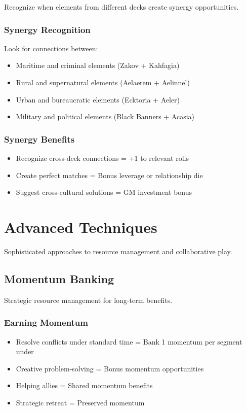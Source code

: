 Recognize when elements from different decks create synergy opportunities.

\subsubsection{Synergy Recognition}

Look for connections between:
\begin{itemize}
\item Maritime and criminal elements (Zakov + Kahfagia)
\item Rural and supernatural elements (Aelaerem + Aelinnel)
\item Urban and bureaucratic elements (Ecktoria + Aeler)
\item Military and political elements (Black Banners + Acasia)
\end{itemize}

\subsubsection{Synergy Benefits}

\begin{itemize}
\item Recognize cross-deck connections = +1 to relevant rolls
\item Create perfect matches = Bonus leverage or relationship die
\item Suggest cross-cultural solutions = GM investment bonus
\end{itemize}

\section{Advanced Techniques}

Sophisticated approaches to resource management and collaborative play.

\subsection{Momentum Banking}

Strategic resource management for long-term benefits.

\subsubsection{Earning Momentum}

\begin{itemize}
\item Resolve conflicts under standard time = Bank 1 momentum per segment under
\item Creative problem-solving = Bonus momentum opportunities
\item Helping allies = Shared momentum benefits
\item Strategic retreat = Preserved momentum
\end{itemize}

